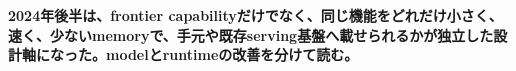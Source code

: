\noindent\textbf{2024年後半は、frontier capabilityだけでなく、同じ機能をどれだけ小さく、速く、少ないmemoryで、手元や既存serving基盤へ載せられるかが独立した設計軸になった。modelとruntimeの改善を分けて読む。}\autocite{src-031c86eaad2b,src-3aa7f9dab810}
